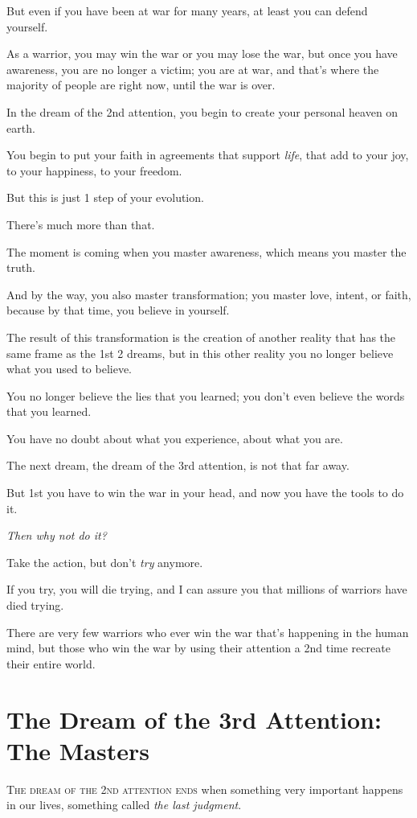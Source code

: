 \documentclass{article}
\numberwithin{equation}{section}
\begin{document}
But even if you have been at war for many years, at least you can defend yourself.

As a warrior, you may win the war or you may lose the war, but once you have awareness, you are no longer a victim; you are at war, and that's where the majority of people are right now, until the war is over.

%
In the dream of the 2nd attention, you begin to create your personal heaven on earth.

You begin to put your faith in agreements that support \textit{life}, that add to your joy, to your happiness, to your freedom.

But this is just 1 step of your evolution.

There's much more than that.

The moment is coming when you master awareness, which means you master the truth.

And by the way, you also master transformation; you master love, intent, or faith, because by that time, you believe in yourself.

%
The result of this transformation is the creation of another reality that has the same frame as the 1st 2 dreams, but in this other reality you no longer believe what you used to believe.

You no longer believe the lies that you learned; you don't even believe the words that you learned.

You have no doubt about what you experience, about what you are.

%
The next dream, the dream of the 3rd attention, is not that far away.

But 1st you have to win the war in your head, and now you have the tools to do it.

\textit{Then why not do it?}

Take the action, but don't \textit{try} anymore.

If you try, you will die trying, and I can assure you that millions of warriors have died trying.

There are very few warriors who ever win the war that's happening in the human mind, but those who win the war by using their attention a 2nd time recreate their entire world.

\section{The Dream of the 3rd Attention: The Masters}
\textsc{The dream of the 2nd attention ends} when something very important happens in our lives, something called \textit{the last judgment}.
\end{document}
